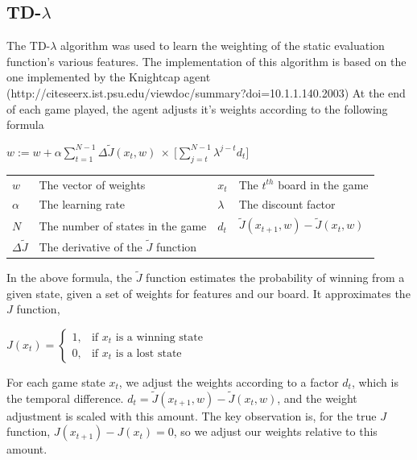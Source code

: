 \documentclass[11pt,twocolumn]{article}
\newcommand{\tdl}{TD-$\lambda$ }
\begin{document}
\subsection{\tdl}
The \tdl algorithm was used to learn the weighting of the static evaluation function's various features. The implementation of this algorithm is based on the one implemented by the Knightcap agent (http://citeseerx.ist.psu.edu/viewdoc/summary?doi=10.1.1.140.2003) %
At the end of each game played, the agent adjusts it's weights according to the following formula
\begin{center}

    $\displaystyle w := w + \alpha \sum _{t=1} ^{N-1} \Delta \tilde{J}(x_t,w) \: \times \: \Big[ \sum ^ {N-1} _{j=t} \lambda^{j-t} d_t \Big] $\\
        
    \begin{tabular}{  l l | l l }
      $w$                   & The vector of weights                         &$x_t$  & The $t^{th}$ board in the game \\
      $\alpha$              & The learning rate                             &$\lambda$      &The discount factor \\
      $N$                   & The number of states in the game              &$d_t$          &$\tilde{J}(x_{t+1},w) - \tilde{J}(x_t,w)$\\
      $\Delta \tilde{J}$    & The derivative of the $\tilde{J}$ function    &               &\\
    \end{tabular}
\end{center}

In the above formula, the $\tilde{J}$ function estimates the probability of winning from a given state, given a set of weights for features and our board. It approximates the $J$ function, \\
\begin{center}
$
J(x_t) = \begin{cases} 1, & \mbox{if } x_t\mbox{ is a winning state} \\ 0, & \mbox{if } x_t\mbox{ is a lost state} \end{cases}
$
\end{center}

For each game state $x_t$, we adjust the weights according to a factor $d_t$, which is the temporal difference. $d_t = \tilde{J}(x_{t+1},w) - \tilde{J}(x_t,w)$, and the weight adjustment is scaled with this amount. The key observation is, for the true $J$ function, $J(x_{t+1}) - J(x_t) = 0$, so we adjust our weights relative to this amount.
\end{document}
